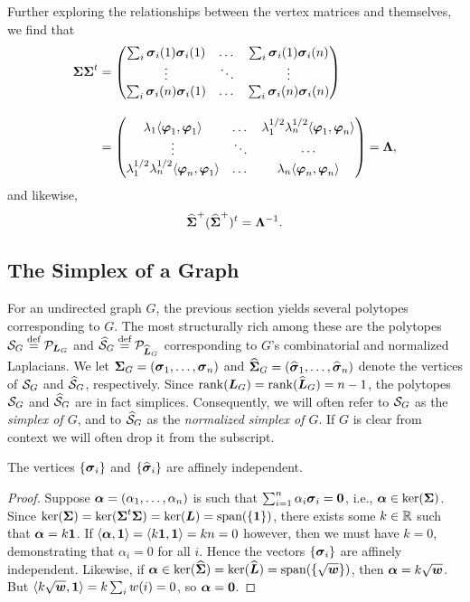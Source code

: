 Further exploring the relationships between the vertex matrices and themselves, we find that 
\begin{align}
\boldsymbol{\Sigma}\boldsymbol{\Sigma}^t &= 
\begin{pmatrix}
\sum_i \vb*{\sigma}_i(1)\vb*{\sigma}_i(1) & \dots & \sum_i \vb*{\sigma}_i(1)\vb*{\sigma}_i(n) \\
\vdots &\ddots  & \vdots \\
\sum_i \vb*{\sigma}_i(n)\vb*{\sigma}_i(1) & \dots & \sum_i \vb*{\sigma}_i(n)\vb*{\sigma}_i(n)
\end{pmatrix}\notag 
\\[10pt] 
&= 
\begin{pmatrix}
\lambda_1 \langle \vb*{\varphi}_1,\vb*{\varphi}_1\rangle & \dots & \lambda_1^{1/2}\lambda_n^{1/2}\langle \vb*{\varphi}_1,\vb*{\varphi}_n\rangle \\
\vdots & \ddots & \cdots \\
\lambda_1^{1/2}\lambda_n^{1/2}\langle \vb*{\varphi}_n,\vb*{\varphi}_1\rangle & \dots &\lambda_n \langle \vb*{\varphi}_n,\vb*{\varphi}_n\rangle 
\end{pmatrix} = \vb{\Lambda},\label{eq:SvSv^t}
\end{align}
and likewise, 
\begin{equation}
\label{eq:SvSv+}
\widehat{\boldsymbol{\Sigma}}^+(\widehat{\boldsymbol{\Sigma}}^+)^t = \vb{\Lambda}^{-1}.
\end{equation}





\subsection{The Simplex of a Graph}
\label{sec:graph_to_simplex}
For an undirected graph $G$, the previous section yields several polytopes corresponding to $G$. The most structurally rich among these are the polytopes $\mathcal{S}_G\overset{\text{def}}{=} \mathcal{P}_{\vb*{L}_G}$ and $\widehat{\mathcal{S}}_G\overset{\text{def}}{=} \mathcal{P}_{\widehat{\vb*{L}}_G}$ corresponding to $G$'s combinatorial and normalized Laplacians.  We let $\boldsymbol{\Sigma}_G=(\vb*{\sigma}_1,\dots,\vb*{\sigma}_n)$ and $\widehat{\boldsymbol{\Sigma}}_G=(\widehat{\vb*{\sigma}}_1,\dots,\widehat{\vb*{\sigma}}_n)$ denote the vertices of $\mathcal{S}_G$ and $\widehat{\mathcal{S}}_G$, respectively. Since $\rank(\vb*{L}_G)=\rank(\widehat{\vb*{L}}_G)=n-1$, the polytopes $\mathcal{S}_G$ and $\widehat{\mathcal{S}}_G$ are in fact simplices. Consequently, we will often refer to $\mathcal{S}_G$ as the \emph{simplex of $G$}, and to $\widehat{\mathcal{S}}_G$ as the \emph{normalized simplex of $G$}. If $G$ is clear from context we will often drop it from the subscript. 

\begin{lemma}
\label{lem:sv_affine_indep}
The vertices $\{\vb*{\sigma}_i\}$  and $\{\widehat{\vb*{\sigma}}_i\}$ are affinely independent. 
\end{lemma}
\begin{proof}
Suppose $\vb*{\alpha} = (\alpha_1,\dots,\alpha_n)$ is such that 
$\sum_{i=1}^n \alpha_i\vb*{\sigma}_i = \vb{0}$, i.e., $\vb*{\alpha}\in\ker(\boldsymbol{\Sigma})$. Since $\ker(\boldsymbol{\Sigma})=\ker(\boldsymbol{\Sigma}^t\boldsymbol{\Sigma})=\ker(\vb*{L})=\textnormal{span}(\{\vb{1}\})$, there exists some $k\in \mathbb{R}$ such that $\vb*{\alpha}=k\vb{1}$. If $\langle \vb*{\alpha},\vb{1}\rangle = \langle k\vb{1},\vb{1}\rangle=kn=0$ however, then we must have $k=0$, demonstrating that $\alpha_i=0$ for all $i$. Hence the vectors $\{\vb*{\sigma}_i\}$ are affinely independent. Likewise, if $\vb*{\alpha}\in\ker(\widehat{\boldsymbol{\Sigma}})=\ker(\widehat{\vb*{L}})=\textnormal{span}(\{\sqrt{\vb*{w}}\})$, then $\vb*{\alpha}=k\sqrt{\vb*{w}}$. But $\langle k\sqrt{\vb*{w}},\vb{1}\rangle = k\sum_{i}w(i)=0$, so $\vb*{\alpha}=\vb{0}$. 
\end{proof}

